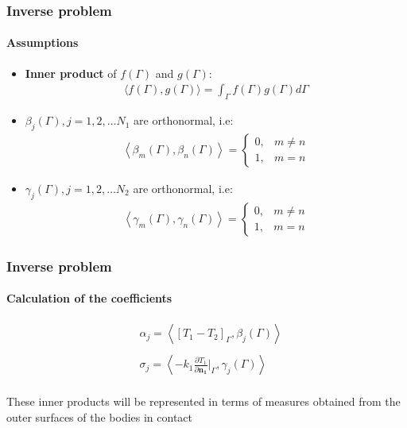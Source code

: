 \documentclass{beamer}
\begin{document}
\begin{frame}
	\frametitle{Inverse problem}
	\framesubtitle{Assumptions}
	\begin{itemize}
		\item \textbf{Inner product} of $f(\Gamma)$ and $g(\Gamma)$:
		\begin{align*}
		 \langle f(\Gamma), g(\Gamma) \rangle = \int_{\Gamma} f(\Gamma) g(\Gamma)d\Gamma
		\end{align*}
		\item $\beta_j(\Gamma), j=1,2,\ldots N_1$ are orthonormal, i.e:
		\begin{align*}
		\left\langle  \beta_m(\Gamma), \beta_n(\Gamma) \right\rangle = \left\lbrace
		\begin{matrix}
		0, & m \neq n \\
		1, & m = n 
		\end{matrix}
		\right.
		\end{align*}
		
		\item $\gamma_j(\Gamma), j=1,2,\ldots N_2$ are orthonormal, i.e:
		\begin{align*}
		\left\langle  \gamma_m(\Gamma), \gamma_n(\Gamma) \right\rangle = \left\lbrace
		\begin{matrix}
		0, & m \neq n \\
		1, & m = n 
		\end{matrix}
		\right.
		\end{align*}
	\end{itemize}
\end{frame}
%
\begin{frame}
	\frametitle{Inverse problem}
	\framesubtitle{Calculation of the coefficients}
	\begin{alertblock}{}
	\begin{align*}
		& \alpha_j = \left\langle [T_1 - T_2]_\Gamma, \beta_j(\Gamma) \right\rangle \\ \\
		& \sigma_j = \left\langle - k_1 \frac{\partial T_1}{\partial\mathbf{n_1}}\bigg|_\Gamma, \gamma_j(\Gamma) \right\rangle \\
	\end{align*}
\end{alertblock}
	
	These inner products will be represented in terms of measures obtained from the outer surfaces of the bodies in contact
\end{frame}
%
\end{document}

